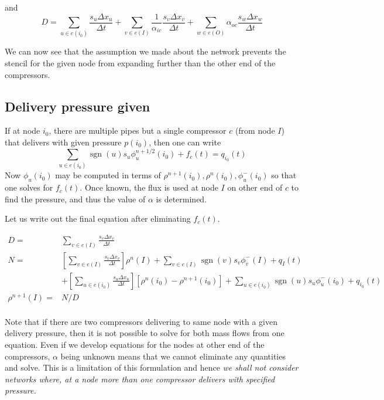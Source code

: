 \documentclass{amsart}
\DeclareMathOperator{\sgn}{sgn}
\begin{document}
and $$D = \sum_{u \in e(i_0)}\frac{s_u \Delta x_u}{\Delta t} + 
\sum_{v \in e(I)}\frac{1}{\alpha_{ic}} \frac{s_{v} \Delta x_{v}}{\Delta t}  + 
\sum_{w \in e(O)}\alpha_{oc} \frac{s_{w} \Delta x_{w}}{\Delta t} $$

We can now see that the assumption we made about the network prevents the stencil for the given node from expanding further than  the other end of the compressors.

\subsection{Delivery pressure given}

If at node $i_0$, there are multiple pipes but  a single compressor $c$ (from node $I$) that delivers with given pressure $p(i_0)$, then one can write
\begin{equation}
\sum_{u \in e(i_0)} \sgn(u) s_u\phi_u^{n+1/2}(i_0) + f_c(t) = q_{i_0}(t) 
\end{equation}
Now $\phi_u(i_0)$ may be computed in terms of $\rho^{n+1}(i_0), \rho^{n}(i_0), \phi_{u}^-(i_0)$ so that one solves for $f_c(t)$. Once known, the flux is used at node $I$ on other end of $c$ to find the pressure, and thus the value of $\alpha$ is determined.

Let us write out the final equation after eliminating $f_c(t)$.

\begin{align*}
D = & \sum_{v \in e(I)} \frac{s_{v} \Delta x_{v}}{\Delta t} \\
N = & \left[\sum_{v \in e(I)} \frac{s_{v} \Delta x_{v}}{\Delta t}\right]\rho^n(I) + 
\sum_{v \in e(I)}\sgn(v) s_{v} \phi_{v}^-(I) + q_{I}(t) \\
& + \left[\sum_{u \in e(i_0)} \frac{s_{u} \Delta x_{u}}{\Delta t}\right][\rho^n(i_0) - \rho^{n+1}(i_0)] + \sum_{u \in e(i_0)}\sgn(u) s_{u} \phi_{u}^-(i_0) + q_{i_0}(t) \\
\rho^{n+1}(I) = & N/D \\
\end{align*}


Note that if there are two compressors delivering to same node with a given delivery pressure, then it is not possible to  solve for both mass flows from one equation. Even if we develop equations for the nodes at other end of the compressors, $\alpha$ being unknown means that we cannot eliminate any quantities and solve. This is a limitation of this formulation and hence 
\emph{we shall not consider networks where, at a node more than one compressor delivers with specified pressure.}
\end{document}
